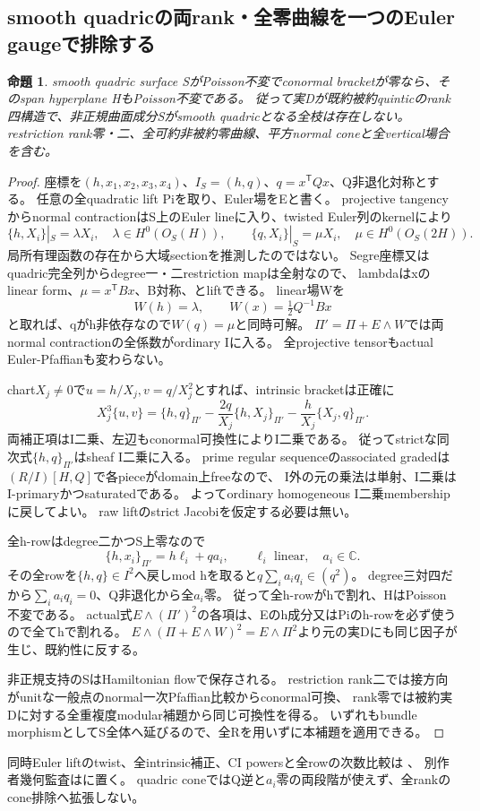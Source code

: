 \documentclass[a4paper,11pt]{ltjsarticle}
\newtheorem{proposition}{命題}[section]
\theoremstyle{definition}
\begin{document}
\subsection{smooth quadricの両rank・全零曲線を一つのEuler gaugeで排除する}
\begin{proposition}\label{prop:smooth-quadric-all-ranks-all-R-empty}
smooth quadric surface SがPoisson不変でconormal bracketが零なら、そのspan hyperplane HもPoisson不変である。
従って実Dが既約被約quinticのrank四構造で、非正規曲面成分Sがsmooth quadricとなる全枝は存在しない。
restriction rank零・二、全可約非被約零曲線、平方normal coneと全vertical場合を含む。
\end{proposition}
\begin{proof}
座標を$(h,x_1,x_2,x_3,x_4)$、$I_S=(h,q)$、$q=x^{\mathsf T}Qx$、Q非退化対称とする。
任意の全quadratic lift Piを取り、Euler場をEと書く。
projective tangencyからnormal contractionはS上のEuler lineに入り、twisted Euler列のkernelにより
\[
 \{h,X_i\}|_S=\lambda X_i,\quad\lambda\in H^0(O_S(H)),\qquad
 \{q,X_i\}|_S=\mu X_i,\quad\mu\in H^0(O_S(2H)).
\]
局所有理函数の存在から大域sectionを推測したのではない。
Segre座標又はquadric完全列からdegree一・二restriction mapは全射なので、
lambdaはxのlinear form、$\mu=x^{\mathsf T}Bx$、B対称、とliftできる。
linear場Wを
\[
 W(h)=\lambda,
 \qquad W(x)=\tfrac12 Q^{-1}Bx
\]
と取れば、qがh非依存なので$W(q)=\mu$と同時可解。
$\Pi'=\Pi+E\wedge W$では両normal contractionの全係数がordinary Iに入る。
全projective tensorもactual Euler-Pfaffianも変わらない。

chart$X_j\ne0$で$u=h/X_j,v=q/X_j^2$とすれば、intrinsic bracketは正確に
\[
 X_j^3\{u,v\}=\{h,q\}_{\Pi'}-\frac{2q}{X_j}\{h,X_j\}_{\Pi'}
                         -\frac h{X_j}\{X_j,q\}_{\Pi'}.
\]
両補正項はI二乗、左辺もconormal可換性によりI二乗である。
従ってstrictな同次式$\{h,q\}_{\Pi'}$はsheaf I二乗に入る。
prime regular sequenceのassociated gradedは$(R/I)[H,Q]$で各pieceがdomain上freeなので、
I外の元の乗法は単射、I二乗はI-primaryかつsaturatedである。
よってordinary homogeneous I二乗membershipに戻してよい。
raw liftのstrict Jacobiを仮定する必要は無い。

全h-rowはdegree二かつS上零なので
\[
 \{h,x_i\}_{\Pi'}=h\ell_i+qa_i,
 \qquad\ell_i\text{ linear},\quad a_i\in\mathbb C.
\]
その全rowを$\{h,q\}\in I^2$へ戻しmod hを取ると$q\sum_i a_iq_i\in(q^2)$。
degree三対四だから$\sum_i a_iq_i=0$、Q非退化から全$a_i$零。
従って全h-rowがhで割れ、HはPoisson不変である。
actual式$E\wedge(\Pi')^2$の各項は、Eのh成分又はPiのh-rowを必ず使うので全てhで割れる。
$E\wedge(\Pi+E\wedge W)^2=E\wedge\Pi^2$より元の実Dにも同じ因子が生じ、既約性に反する。

非正規支持のSはHamiltonian flowで保存される。
restriction rank二では接方向がunitな一般点のnormal一次Pfaffian比較からconormal可換、
rank零では被約実Dに対する全重複度modular補題から同じ可換性を得る。
いずれもbundle morphismとしてS全体へ延びるので、全Rを用いずに本補題を適用できる。
\end{proof}
同時Euler liftのtwist、全intrinsic補正、CI powersと全rowの次数比較は
、
別作者幾何監査はに置く。
quadric coneではQ逆と$a_i$零の両段階が使えず、全rankのcone排除へ拡張しない。
\end{document}
